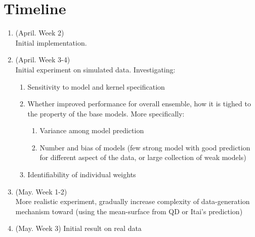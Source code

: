 \documentclass[11pt]{article}
\theoremstyle{definition}
\begin{document}
\clearpage
\section{\textbf{Timeline}}
\begin{enumerate}
\item (April. Week 2) \\
Initial implementation. 
\item (April. Week 3-4) \\
Initial experiment on simulated data.
Investigating:
\begin{enumerate}
\item Sensitivity to model and kernel specification
\item Whether improved performance for overall ensemble, how it is tighed to the property of the base models. More specifically:
\begin{enumerate}
\item Variance among model prediction
\item Number and bias of models (few strong model with good prediction for different aspect of the data, or large collection of weak models)
\end{enumerate}
\item Identifiability of individual weights
\end{enumerate} 
\item (May. Week 1-2) \\
More realistic experiment, gradually increase complexity of data-generation mechanism toward (using the mean-surface from QD or Itai's prediction)
\item (May. Week 3) Initial result on real data
\end{enumerate}

\clearpage

\end{document}
